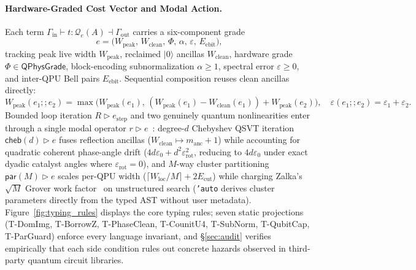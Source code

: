 \documentclass[acmsmall,screen,anonymous]{acmart}
\DeclareRobustCommand{\_}{\ifmmode\text{\char95}\else\char95\penalty0\relax\fi}
\theoremstyle{plain}
\newcommand{\QPhysGrade}{\ensuremath{\mathsf{QPhysGrade}}}
\begin{document}
\paragraph{Hardware-Graded Cost Vector and Modal Action.}
Each term $\Gamma_{\mathrm{in}} \vdash t : \mathcal{Q}_{e}(A) \dashv \Gamma_{\mathrm{out}}$ carries a six-component grade
\[
  e = \bigl(W_{\mathrm{peak}},\, W_{\mathrm{clean}},\, \Phi,\, \alpha,\, \varepsilon,\, E_{\mathrm{ebit}}\bigr),
\]
tracking peak live width $W_{\mathrm{peak}}$, reclaimed $|0\rangle$ ancillas $W_{\mathrm{clean}}$, hardware grade $\Phi \in \QPhysGrade$, block-encoding subnormalization $\alpha \ge 1$, spectral error $\varepsilon \ge 0$, and inter-QPU Bell pairs $E_{\mathrm{ebit}}$. Sequential composition reuses clean ancillas directly:
\[
  W_{\mathrm{peak}}(e_1 \mathbin{;;} e_2) = \max\!\bigl(W_{\mathrm{peak}}(e_1),\, (W_{\mathrm{peak}}(e_1) - W_{\mathrm{clean}}(e_1)) + W_{\mathrm{peak}}(e_2)\bigr), \quad \varepsilon(e_1 \mathbin{;;} e_2) = \varepsilon_1 + \varepsilon_2.
\]
Bounded loop iteration $R \triangleright e_{\mathrm{step}}$ and two genuinely quantum nonlinearities enter through a single modal operator $r \triangleright e$~\cite{orchard2019granule,gaboardi2016combining}: degree-$d$ Chebyshev QSVT iteration $\mathsf{cheb}(d) \triangleright e$ fuses reflection ancillas ($W_{\mathrm{clean}} \mapsto m_{\mathrm{anc}} + 1$) while accounting for quadratic coherent phase-angle drift ($4 d \varepsilon_0 + d^2 \varepsilon_{\mathrm{rot}}^2$, reducing to $4d\varepsilon_0$ under exact dyadic catalyst angles where $\varepsilon_{\mathrm{rot}} = 0$), and $M$-way cluster partitioning $\mathsf{par}(M) \triangleright e$ scales per-QPU width ($\lceil W_{\mathrm{loc}}/M \rceil + 2 E_{\mathrm{cut}}$) while charging Zalka's $\sqrt{M}$ Grover work factor~\cite{zalka1999} on unstructured search (\texttt{'auto} derives cluster parameters directly from the typed AST without user metadata). Figure~\ref{fig:typing_rules} displays the core typing rules; seven static projections (\textsf{T-DomImg}, \textsf{T-BorrowZ}, \textsf{T-PhaseClean}, \textsf{T-CounitU4}, \textsf{T-SubNorm}, \textsf{T-QubitCap}, \textsf{T-ParGuard}) enforce every language invariant, and \S\ref{sec:audit} verifies empirically that each side condition rules out concrete hazards observed in third-party quantum circuit libraries.
\end{document}
